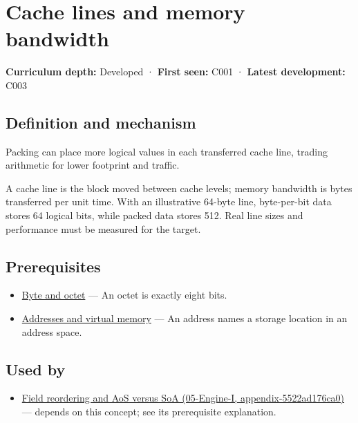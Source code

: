 \hypertarget{appendix-e4ccdbab8320}{}
\section{Cache lines and memory bandwidth}\label{appendix-e4ccdbab8320-cache-lines-and-memory-bandwidth}

\textbf{Curriculum depth:} Developed · \textbf{First seen:} C001 · \textbf{Latest development:} C003

\subsection{Definition and mechanism}\label{appendix-e4ccdbab8320-definition-and-mechanism}

Packing can place more logical values in each transferred cache line, trading arithmetic for lower footprint and traffic.

A cache line is the block moved between cache levels; memory bandwidth is bytes transferred per unit time. With an illustrative 64-byte line, byte-per-bit data stores 64 logical bits, while packed data stores 512. Real line sizes and performance must be measured for the target.

\subsection{Prerequisites}\label{appendix-e4ccdbab8320-prerequisites}

\begin{itemize}
\tightlist
\item
  \hyperref[appendix-5bee2df85484]{Byte and octet} --- An octet is exactly eight bits.
\item
  \hyperref[appendix-18ee4f913c3c]{Addresses and virtual memory} --- An address names a storage location in an address space.
\end{itemize}

\subsection{Used by}\label{appendix-e4ccdbab8320-used-by}

\begin{itemize}
\tightlist
\item
  \href{../05-Engine-I/main.pdf\#nameddest=appendix-5522ad176ca0}{Field reordering and AoS versus SoA (05-Engine-I, appendix-5522ad176ca0)} --- depends on this concept; see its prerequisite explanation.
\end{itemize}

